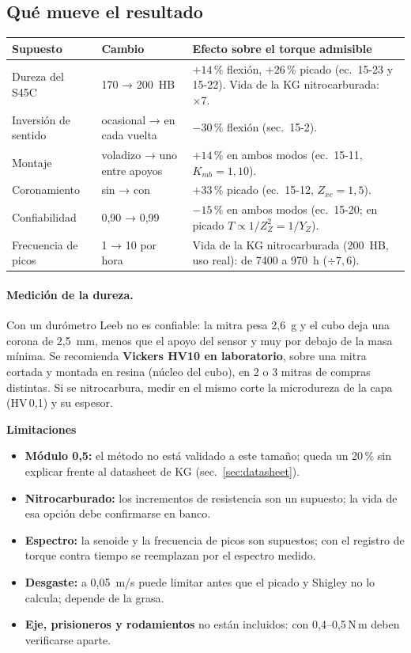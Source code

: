 \documentclass[11pt,a4paper]{article}
\newcommand{\Nm}{\,N\,m\xspace}
\begin{document}
\subsection{Qué mueve el resultado}
\begin{table}[H]\centering\small
\begin{tabularx}{\linewidth}{l l X}
\toprule
Supuesto & Cambio & Efecto sobre el torque admisible\\\midrule
Dureza del S45C & 170 → 200~HB & $+14$\,\% flexión, $+26$\,\% picado (ec.~15-23 y 15-22). Vida de la KG nitrocarburada: ×7.\\
Inversión de sentido & ocasional → en cada vuelta & $-30$\,\% flexión (sec.~15-2).\\
Montaje & voladizo → uno entre apoyos & $+14$\,\% en ambos modos (ec.~15-11, $K_{mb}=1{,}10$).\\
Coronamiento & sin → con & $+33$\,\% picado (ec.~15-12, $Z_{xc}=1{,}5$).\\
Confiabilidad & 0,90 → 0,99 & $-15$\,\% en ambos modos (ec.~15-20; en picado $T\propto1/Z_Z^2=1/Y_Z$).\\
Frecuencia de picos & 1 → 10 por hora & Vida de la KG nitrocarburada (200~HB, uso real): de 7400 a 970~h ($\div7{,}6$).\\
\bottomrule
\end{tabularx}
\end{table}

\paragraph{Medición de la dureza.}\label{sec:dureza}
Con un durómetro Leeb no es confiable: la mitra pesa 2,6~g y el cubo deja una corona de 2,5~mm, menos que el apoyo del
sensor y muy por debajo de la masa mínima. Se recomienda \textbf{Vickers HV10 en laboratorio}, sobre una mitra cortada y
montada en resina (núcleo del cubo), en 2 o 3 mitras de compras distintas. Si se nitrocarbura, medir en el mismo corte la
microdureza de la capa (HV\,0,1) y su espesor.

\textbf{Limitaciones}
\begin{itemize}
  \item \textbf{Módulo 0,5:} el método no está validado a este tamaño; queda un 20\,\% sin explicar frente al datasheet de KG
        (sec.~\ref{sec:datasheet}).
  \item \textbf{Nitrocarburado:} los incrementos de resistencia son un supuesto; la vida de esa opción debe confirmarse en banco.
  \item \textbf{Espectro:} la senoide y la frecuencia de picos son supuestos; con el registro de torque contra tiempo se
        reemplazan por el espectro medido.
  \item \textbf{Desgaste:} a 0,05~m/s puede limitar antes que el picado y Shigley no lo calcula; depende de la grasa.
  \item \textbf{Eje, prisioneros y rodamientos} no están incluidos: con 0,4--0,5\Nm deben verificarse aparte.
\end{itemize}
\end{document}
